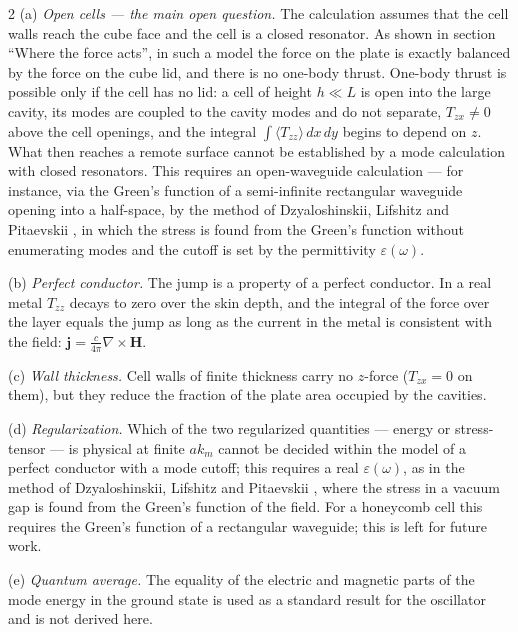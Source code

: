 \documentclass[twoside, 10pt]{article}
\def\myvspacebeforesubsection{-2.0mm}
\def\myvspaceaftersubsection{-2.5mm}
\begin{document}
\begin{multicols}{2}
(a) \textit{Open cells --- the main open question.} The calculation assumes that the cell walls reach the cube face and the cell is a closed resonator. As shown in section ``Where the force acts'', in such a model the force on the plate is exactly balanced by the force on the cube lid, and there is no one-body thrust. One-body thrust is possible only if the cell has no lid: a cell of height \(h\ll L\) is open into the large cavity, its modes are coupled to the cavity modes and do not separate, \(T_{zx}\neq0\) above the cell openings, and the integral \(\int\langle T_{zz}\rangle\,dx\,dy\) begins to depend on \(z\). What then reaches a remote surface cannot be established by a mode calculation with closed resonators. This requires an open-waveguide calculation --- for instance, via the Green's function of a semi-infinite rectangular waveguide opening into a half-space, by the method of Dzyaloshinskii, Lifshitz and Pitaevskii \cite{DLP1961}, in which the stress is found from the Green's function without enumerating modes and the cutoff is set by the permittivity \(\varepsilon(\omega)\).

(b) \textit{Perfect conductor.} The jump is a property of a perfect conductor. In a real metal
\(T_{zz}\) decays to zero over the skin depth, and the integral of the force over the layer equals
the jump as long as the current in the metal is consistent with the field:
\(\mathbf j=\frac c{4\pi}\nabla\times\mathbf H\).

(c) \textit{Wall thickness.} Cell walls of finite thickness carry no \(z\)-force (\(T_{zx}=0\) on
them), but they reduce the fraction of the plate area occupied by the cavities.

(d) \textit{Regularization.} Which of the two regularized quantities --- energy or stress-tensor ---
is physical at finite \(ak_m\) cannot be decided within the model of a perfect conductor with a mode
cutoff; this requires a real \(\varepsilon(\omega)\), as in the method of Dzyaloshinskii, Lifshitz
and Pitaevskii \cite{DLP1961}, where the stress in a vacuum gap is found from the Green's function of
the field. For a honeycomb cell this requires the Green's function of a rectangular waveguide; this
is left for future work.

(e) \textit{Quantum average.} The equality of the electric and magnetic parts of the mode energy in
the ground state is used as a standard result for the oscillator and is not derived here.

\vspace{\myvspacebeforesubsection}
\subsection*{}
\vspace{\myvspaceaftersubsection}



\end{multicols}
\end{document}

